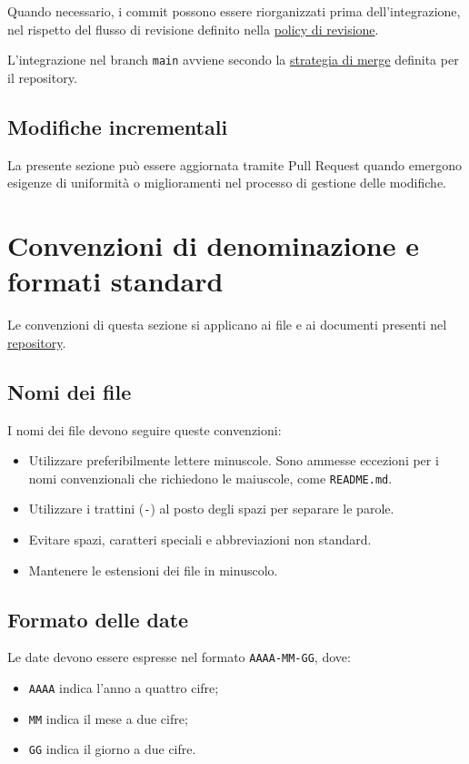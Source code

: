 \documentclass[11pt, a4paper]{article}
\begin{document}
Quando necessario, i commit possono essere riorganizzati prima dell'integrazione, nel rispetto del flusso di revisione definito nella \hyperref[subsec:regole-generali]{policy di revisione}.

L'integrazione nel branch \texttt{main} avviene secondo la \hyperref[subsec:pull-request-e-merge]{strategia di merge} definita per il repository.

\subsection{Modifiche incrementali}

La presente sezione può essere aggiornata tramite Pull Request quando emergono esigenze di uniformità o miglioramenti nel processo di gestione delle modifiche.

\section{Convenzioni di denominazione e formati standard}
\label{sec:convenzioni-denominazione}

Le convenzioni di questa sezione si applicano ai file e ai documenti presenti nel \href{https://github.com/On-By-One-Team/On-By-One.github.io}{repository}.

\subsection{Nomi dei file}

I nomi dei file devono seguire queste convenzioni:
\begin{itemize}
    \item Utilizzare preferibilmente lettere minuscole. Sono ammesse eccezioni per i nomi convenzionali che richiedono le maiuscole, come \texttt{README.md}.
    \item Utilizzare i trattini (\texttt{-}) al posto degli spazi per separare le parole.
    \item Evitare spazi, caratteri speciali e abbreviazioni non standard.
    \item Mantenere le estensioni dei file in minuscolo.
\end{itemize}

\subsection{Formato delle date}

Le date devono essere espresse nel formato \texttt{AAAA-MM-GG}, dove:
\begin{itemize}
    \item \texttt{AAAA} indica l'anno a quattro cifre;
    \item \texttt{MM} indica il mese a due cifre;
    \item \texttt{GG} indica il giorno a due cifre.
\end{itemize}
\end{document}
